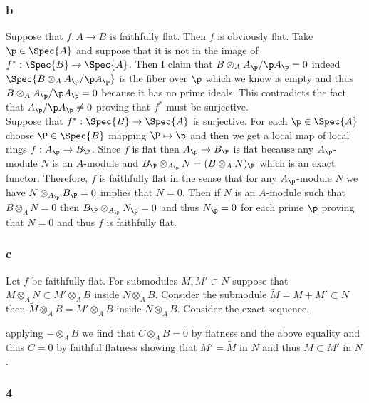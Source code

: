 \documentclass[12pt]{article}
\begin{document}
\subsubsection{b}

Suppose that $f : A \to B$ is faithfully flat. Then $f$ is obviously flat. Take $\p \in \Spec{A}$ and suppose that it is not in the image of $f^* : \Spec{B} \to \Spec{A}$. Then I claim that $B \otimes_A A_\p / \p A_\p = 0$ indeed $\Spec{B \otimes_A A_\p / \p A_\p}$ is the fiber over $\p$ which we know is empty and thus $B \otimes_A A_\p / \p A_\p = 0$ because it has no prime ideals. This contradicts the fact that $A_\p / \p A_\p \neq 0$ proving that $f^*$ must be surjective.
\bigskip\\
Suppose that $f^* : \Spec{B} \to \Spec{A}$ is surjective. For each $\p \in \Spec{A}$ choose $\P \in \Spec{B}$ mapping $\P \mapsto \p$ and then we get a local map of local rings $f : A_\p \to B_\P$. Since $f$ is flat then $A_\p \to B_\P$ is flat because any $A_\p$-module $N$ is an $A$-module and $B_\P \otimes_{A_\p} N = (B \otimes_A N)_\P$ which is an exact functor. Therefore, $f$ is faithfully flat in the sense that for any $A_\p$-module $N$ we have $N \otimes_{A_\p} B_\P = 0$ implies that $N = 0$. Then if $N$ is an $A$-module such that $B \otimes_A N = 0$ then $B_\P \otimes_{A_\p} N_\p = 0$ and thus $N_\p = 0$ for each prime $\p$ proving that $N = 0$ and thus $f$ is faithfully flat.

\subsubsection{c}

Let $f$ be faithfully flat. For submodules $M,M' \subset N$ suppose that $M \otimes_A N \subset M' \otimes_A B$ inside $N \otimes_A B$. Consider the submodule $\tilde{M} = M + M' \subset N$ then $\tilde{M} \otimes_A B = M' \otimes_A B$ inside $N \otimes_A B$. Consider the exact sequence,
\begin{center}
\end{center}
applying $- \otimes_A B$ we find that $C \otimes_A B = 0$ by flatness and the above equality and thus $C = 0$ by faithful flatness showing that $M' = \tilde{M}$ in $N$ and thus $M \subset M'$ in $N$.

\subsubsection{4}
\end{document}
